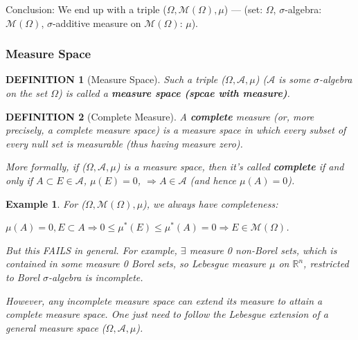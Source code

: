\documentclass[12pt]{article}
\theoremstyle{blueplain}
\theoremstyle{bluedef}
\newtheorem{definition}{DEFINITION}[section]
\theoremstyle{blueremark}
\newtheorem{example}{Example}[section]
\newcommand{\R}{\mathbb{R}}
\numberwithin{equation}{section}
\begin{document}
Conclusion: We end up with a triple ($\Omega, \mathcal{M}(\Omega), \mu$) --- (set: $\Omega$, $\sigma$-algebra: $\mathcal{M}(\Omega)$, $\sigma$-additive measure on $\mathcal{M}(\Omega)$: $\mu$).

\subsubsection{Measure Space}

\begin{definition}[Measure Space]

  Such a triple ($\Omega, \mathcal{A}, \mu$) ($\mathcal{A}$ is some $\sigma$-algebra on the set $\Omega$) is called a \textbf{measure space (spcae with measure)}.
\end{definition}

\begin{definition}[Complete Measure]

  A \textbf{complete} measure (or, more precisely, a complete measure space) is a measure space in which every subset of every null set is measurable (thus having measure zero).

  More formally, if ($\Omega, \mathcal{A}, \mu$) is a measure space, then it's called \textbf{complete} if and only if $A \subset E \in \mathcal{A}$, $\mu(E) = 0$, $\Rightarrow A \in \mathcal{A}$ (and hence $\mu(A)=0$).
\end{definition}

\begin{example}
  For ($\Omega, \mathcal{M}(\Omega), \mu$), we always have completeness:

  $\mu(A) = 0, E \subset A \Rightarrow 0 \leq \mu^*(E) \leq \mu^*(A) = 0 \Rightarrow E \in \mathcal{M}(\Omega)$.

  But this FAILS in general. For example, $\exists$ measure 0 non-Borel sets, which is contained in some measure 0 Borel sets, so Lebesgue measure $\mu$ on $\R^n$, restricted to Borel $\sigma$-algebra is incomplete.

  However, any incomplete measure space can extend its measure to attain a complete measure space. One just need to follow the Lebesgue extension of a general measure space ($\Omega, \mathcal{A}, \mu$).
\end{example}
\end{document}
